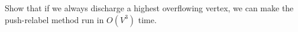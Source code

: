 Show that if we always discharge a highest overflowing vertex, we can
make the push-relabel method run in $O(V^3)$ time.